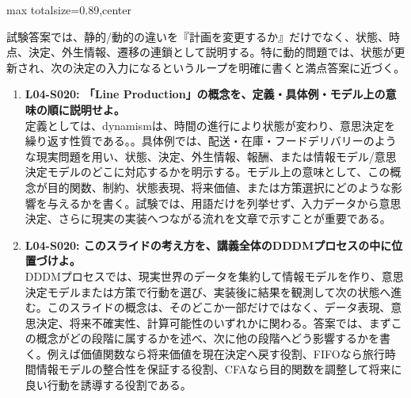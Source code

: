 \begin{minipage}[t]{0.58\textwidth}
\begin{adjustbox}{max totalsize={\textwidth}{0.89\textheight},center}
\begin{minipage}{\textwidth}
試験答案では、静的/動的の違いを『計画を変更するか』だけでなく、状態、時点、決定、外生情報、遷移の連鎖として説明する。特に動的問題では、状態が更新され、次の決定の入力になるというループを明確に書くと満点答案に近づく。\par{}\begin{enumerate}\item \textbf{L04-S020: 「Line Production」の概念を、定義・具体例・モデル上の意味の順に説明せよ。}\\定義としては、dynamismは、時間の進行により状態が変わり、意思決定を繰り返す性質である。。具体例では、配送・在庫・フードデリバリーのような現実問題を用い、状態、決定、外生情報、報酬、または情報モデル/意思決定モデルのどこに対応するかを明示する。モデル上の意味として、この概念が目的関数、制約、状態表現、将来価値、または方策選択にどのような影響を与えるかを書く。試験では、用語だけを列挙せず、入力データから意思決定、さらに現実の実装へつながる流れを文章で示すことが重要である。\item \textbf{L04-S020: このスライドの考え方を、講義全体のDDDMプロセスの中に位置づけよ。}\\DDDMプロセスでは、現実世界のデータを集約して情報モデルを作り、意思決定モデルまたは方策で行動を選び、実装後に結果を観測して次の状態へ進む。このスライドの概念は、そのどこか一部だけではなく、データ表現、意思決定、将来不確実性、計算可能性のいずれかに関わる。答案では、まずこの概念がどの段階に属するかを述べ、次に他の段階へどう影響するかを書く。例えば価値関数なら将来価値を現在決定へ戻す役割、FIFOなら旅行時間情報モデルの整合性を保証する役割、CFAなら目的関数を調整して将来に良い行動を誘導する役割である。\end{enumerate}
\end{minipage}
\end{adjustbox}
\end{minipage}


